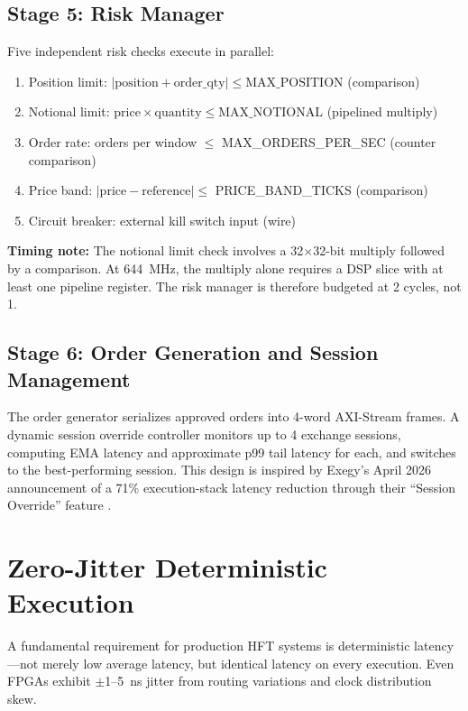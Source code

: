 \documentclass[conference,10pt]{IEEEtran}
\begin{document}
\subsection{Stage 5: Risk Manager}

Five independent risk checks execute in parallel:

\begin{enumerate}[leftmargin=*]
    \item Position limit: $|\text{position} + \text{order\_qty}| \leq \text{MAX\_POSITION}$ (comparison)
    \item Notional limit: $\text{price} \times \text{quantity} \leq \text{MAX\_NOTIONAL}$ (pipelined multiply)
    \item Order rate: orders per window $\leq$ MAX\_ORDERS\_PER\_SEC (counter comparison)
    \item Price band: $|\text{price} - \text{reference}| \leq$ PRICE\_BAND\_TICKS (comparison)
    \item Circuit breaker: external kill switch input (wire)
\end{enumerate}

\textbf{Timing note:} The notional limit check involves a 32$\times$32-bit multiply followed by a comparison. At 644~MHz, the multiply alone requires a DSP slice with at least one pipeline register. The risk manager is therefore budgeted at 2 cycles, not 1.

\subsection{Stage 6: Order Generation and Session Management}

The order generator serializes approved orders into 4-word AXI-Stream frames. A dynamic session override controller monitors up to 4 exchange sessions, computing EMA latency and approximate p99 tail latency for each, and switches to the best-performing session. This design is inspired by Exegy's April 2026 announcement of a 71\% execution-stack latency reduction through their ``Session Override'' feature \cite{exegy2026}.

\section{Zero-Jitter Deterministic Execution}
\label{sec:deterministic}

A fundamental requirement for production HFT systems is deterministic latency---not merely low average latency, but identical latency on every execution. Even FPGAs exhibit $\pm$1--5~ns jitter from routing variations and clock distribution skew.
\end{document}
